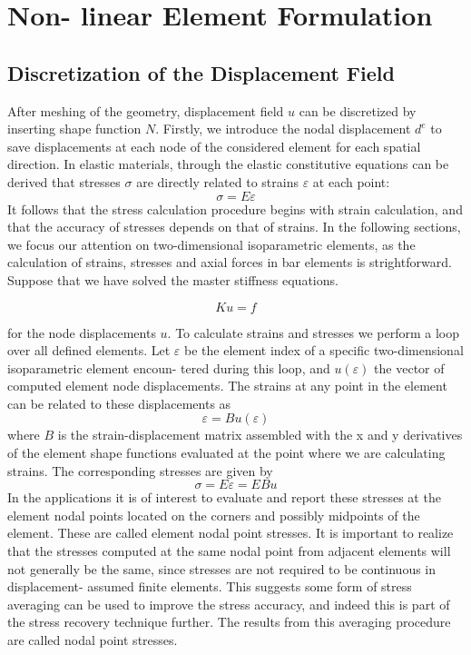\section{Non- linear Element Formulation}
\subsection{Discretization of the Displacement Field}
After meshing of the geometry, displacement field $u$ can be discretized by inserting shape function $N$. Firstly, we introduce the nodal displacement $d^e$ to save displacements at each node of the considered element for each spatial direction.
In elastic materials, through the elastic constitutive equations can be derived that stresses $\sigma$ are directly related to strains $\varepsilon$ at each point:
\begin{equation}
\sigma = E\varepsilon
\end{equation}
It follows that the stress calculation procedure begins with strain calculation, and that the accuracy of stresses depends on that of strains. In the following sections, we focus our attention on two-dimensional isoparametric elements, as the calculation of strains, stresses and axial forces in bar elements is strightforward. Suppose that we have solved the master stiffness equations. 


	\begin{equation}
	Ku = f
	\end{equation}


for the node displacements $u$. To calculate strains and stresses we perform a loop over all defined elements. Let $\varepsilon$ be the element index of a specific two-dimensional isoparametric element encoun- tered during this loop, and $u(\varepsilon)$ the vector of computed element node displacements. The strains at any point in the element can be related to these displacements as 
\begin{equation}
\varepsilon = Bu(\varepsilon) 
\end{equation}
where $B$ is the strain-displacement matrix assembled with the x and y derivatives of the element shape functions evaluated at the point where we are calculating strains. The corresponding stresses are given by 
\begin{equation}
\sigma = E\varepsilon = EBu 
\end{equation}
In the applications it is of interest to evaluate and report these stresses at the element nodal points located on the corners and possibly midpoints of the element. These are called element nodal point stresses.
It is important to realize that the stresses computed at the same nodal point from adjacent elements will not generally be the same, since stresses are not required to be continuous in displacement- assumed finite elements. This suggests some form of stress averaging can be used to improve the stress accuracy, and indeed this is part of the stress recovery technique further. The results from this averaging procedure are called nodal point stresses.


